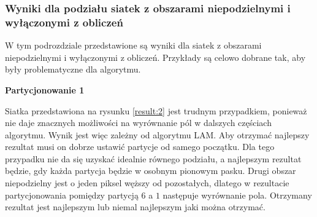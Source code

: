 \subsubsection{Wyniki dla podziału siatek z obszarami niepodzielnymi i wyłączonymi z obliczeń}
W tym podrozdziale przedstawione są wyniki dla siatek z obszarami niepodzielnymi i wyłączonymi
z obliczeń.
Przykłady są celowo dobrane tak, aby były problematyczne dla algorytmu.

\vspace{3mm}
\textbf{Partycjonowanie 1}
\vspace{1mm}

Siatka przedstawiona na rysunku \ref{result:2} jest trudnym przypadkiem, ponieważ nie daje znacznych możliwości na wyrównanie pól
w dalszych częściach algorytmu.
Wynik jest więc zależny od algorytmu LAM.
Aby otrzymać najlepszy rezultat musi on dobrze ustawić partycje od samego początku.
Dla tego przypadku nie da się uzyskać idealnie równego podziału, a najlepszym rezultat będzie, gdy każda partycja będzie
w osobnym pionowym pasku.
Drugi obszar niepodzielny jest o jeden piksel węższy od pozostałych, dlatego w rezultacie partycjonowania pomiędzy partycją
$6$ a $1$ następuje wyrównanie pola.
Otrzymany rezultat jest najlepszym lub niemal najlepszym jaki można otrzymać.

